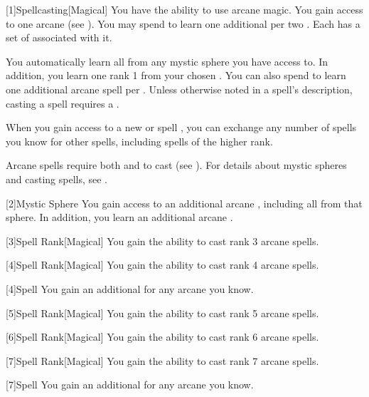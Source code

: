         [1]{Spellcasting}[Magical]
        You have the ability to use arcane magic.
        You gain access to one arcane  (see ).
        You may spend  to learn one additional  per two .
        Each  has a set of  associated with it.

        You automatically learn all  from any mystic sphere you have access to.
        In addition, you learn one rank 1  from your chosen .
        You can also spend  to learn one additional arcane spell per .
        Unless otherwise noted in a spell's description, casting a spell requires a .

        When you gain access to a new  or spell ,
            you can exchange any number of spells you know for other spells,
            including spells of the higher rank.

        Arcane spells require both  and  to cast (see ).
        For details about mystic spheres and casting spells, see .

        [2]{Mystic Sphere} You gain access to an additional arcane , including all  from that sphere.
        In addition, you learn an additional arcane .

        [3]{Spell Rank}[Magical] You gain the ability to cast rank 3 arcane spells.

        [4]{Spell Rank}[Magical] You gain the ability to cast rank 4 arcane spells.

        [4]{Spell} You gain an additional  for any arcane  you know.

        [5]{Spell Rank}[Magical] You gain the ability to cast rank 5 arcane spells.

        [6]{Spell Rank}[Magical] You gain the ability to cast rank 6 arcane spells.

        [7]{Spell Rank}[Magical] You gain the ability to cast rank 7 arcane spells.

        [7]{Spell} You gain an additional  for any arcane  you know.


